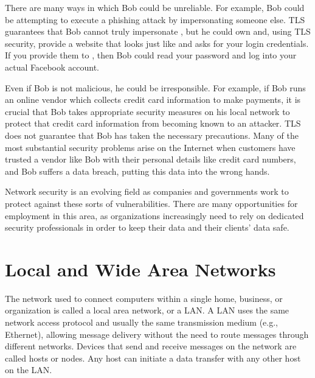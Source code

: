 There are many ways in which Bob could be unreliable. For example, Bob could be attempting to execute a phishing attack by impersonating someone else. TLS guarantees that Bob cannot truly impersonate , but he could own  and, using TLS security, provide a website that looks just like  and asks for your login credentials. If you provide them to , then Bob could read your password and log into your actual Facebook account.

Even if Bob is not malicious, he could be irresponsible. For example, if Bob runs an online vendor which collects credit card information to make payments, it is crucial that Bob takes appropriate security measures on his local network to protect that credit card information from becoming known to an attacker. TLS does not guarantee that Bob has taken the necessary precautions. Many of the most substantial security problems arise on the Internet when customers have trusted a vendor like Bob with their personal details like credit card numbers, and Bob suffers a data breach, putting this data into the wrong hands.

Network security is an evolving field as companies and governments work to protect against these sorts of vulnerabilities. There are many opportunities for employment in this area, as organizations increasingly need to rely on dedicated security professionals in order to keep their data and their clients' data safe.

\section{Local and Wide Area Networks}


The network used to connect computers within a single home, business, or organization is called a local area network, or a LAN. A LAN uses the same network access protocol and usually the same transmission medium (e.g., Ethernet), allowing message delivery without the need to route messages through different networks. Devices that send and receive messages on the network are called hosts or nodes. Any host can initiate a data transfer with any other host on the LAN.

